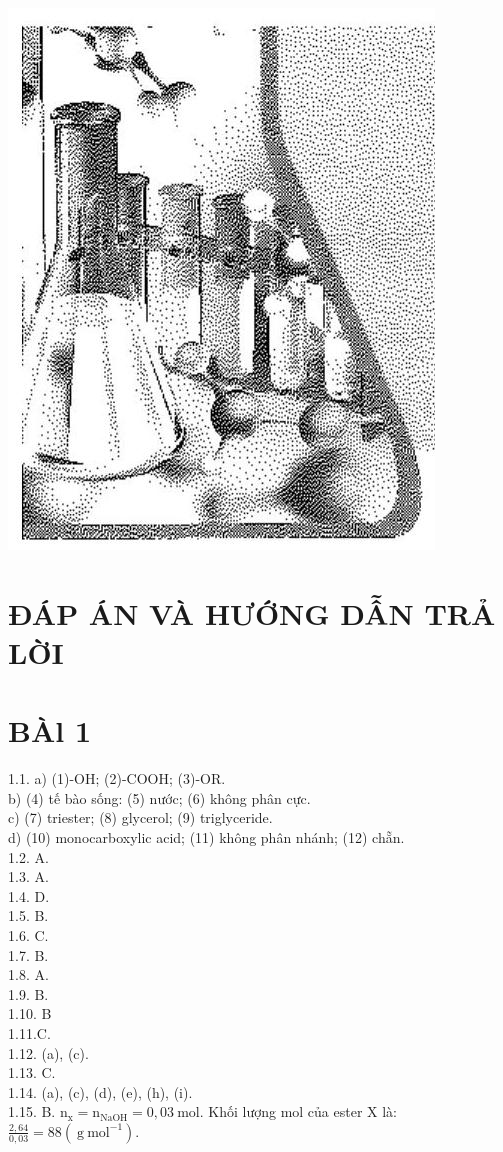\documentclass[10pt]{article}
\begin{document}
\begin{center}
\includegraphics[max width=\textwidth]{2025_10_23_3f52bbaab6caa9e2ff75g-01}
\end{center}

\section*{ĐÁP ÁN VÀ HƯỚNG DẪN TRẢ LỜI}
\section*{BÀl 1}
1.1. a) (1)-OH; (2)-COOH; (3)-OR.\\
b) (4) tế bào sống: (5) nước; (6) không phân cực.\\
c) (7) triester; (8) glycerol; (9) triglyceride.\\
d) (10) monocarboxylic acid; (11) không phân nhánh; (12) chẵn.\\
1.2. A.\\
1.3. A.\\
1.4. D.\\
1.5. B.\\
1.6. C.\\
1.7. B.\\
1.8. A.\\
1.9. B.\\
1.10. B\\
1.11.C.\\
1.12. (a), (c).\\
1.13. C.\\
1.14. (a), (c), (d), (e), (h), (i).\\
1.15. B. $\mathrm{n}_{\mathrm{x}}=\mathrm{n}_{\mathrm{NaOH}}=0,03 \mathrm{~mol}$. Khối lượng mol của ester X là: $\frac{2,64}{0,03}=88\left(\mathrm{~g} \mathrm{~mol}^{-1}\right)$.
\end{document}
